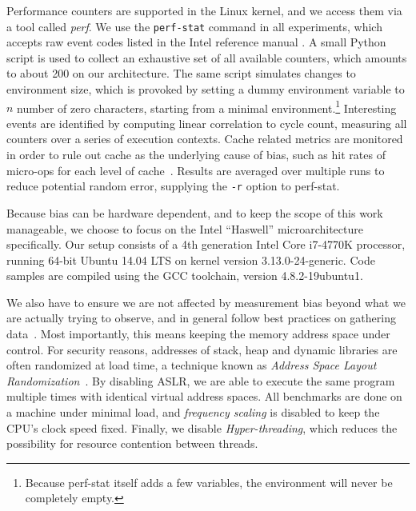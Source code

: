 \documentclass[prodmode,acmtaco]{acmsmall}
\begin{document}
Performance counters are supported in the Linux kernel, and we access them via a tool called \emph{perf}. 
We use the \texttt{perf-stat} command in all experiments, which accepts raw event codes listed in the Intel reference manual \cite{Volume3B}.
A small Python script is used to collect an exhaustive set of all available counters, which amounts to about 200 on our architecture.
The same script simulates changes to environment size, which is provoked by setting a dummy environment variable to $n$ number of zero characters, starting from a minimal environment.\footnote{Because perf-stat itself adds a few variables, the environment will never be completely empty.}
Interesting events are identified by computing linear correlation to cycle count, measuring all counters over a series of execution contexts.
Cache related metrics are monitored in order to rule out cache as the underlying cause of bias, such as hit rates of micro-ops for each level of cache~\cite{OptimizationManual}.
Results are averaged over multiple runs to reduce potential random error, supplying the \texttt{-r} option to perf-stat. %

Because bias can be hardware dependent, and to keep the scope of this work manageable, we choose to focus on the Intel ``Haswell'' microarchitecture specifically.
Our setup consists of a 4th generation Intel\textsuperscript{\textregistered{}} Core\texttrademark{} i7-4770K processor, running 64-bit Ubuntu 14.04 LTS on kernel version 3.13.0-24-generic.
Code samples are compiled using the {\small GCC} toolchain, version 4.8.2-19ubuntu1.

We also have to ensure we are not affected by measurement bias beyond what we are actually trying to observe, and in general follow best practices on gathering data~\cite{Mytkowicz:2009:WrongData}.
Most importantly, this means keeping the memory address space under control.
For security reasons, addresses of stack, heap and dynamic libraries are often randomized at load time, a technique known as \emph{Address Space Layout Randomization}~\cite{Shackham:2004:ASLR}. %
By disabling ASLR, we are able to execute the same program multiple times with identical virtual address spaces.
All benchmarks are done on a machine under minimal load, and \emph{frequency scaling} is disabled to keep the CPU's clock speed fixed.
Finally, we disable \emph{Hyper-threading}, which reduces the possibility for resource contention between threads.
\end{document}
